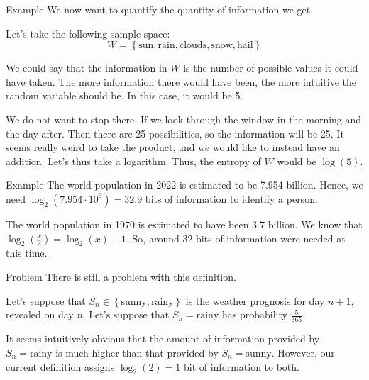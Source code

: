 \documentclass[a4paper]{article}
\begin{document}
\begin{parag}{Example}
    We now want to quantify the quantity of information we get.

    Let's take the following sample space: 
    \[W = \left\{\text{sun}, \text{rain}, \text{clouds}, \text{snow}, \text{hail}\right\}\]
    
    We could say that the information in $W$ is the number of possible values it could have taken. The more information there would have been, the more intuitive the random variable should be. In this case, it would be 5.

    We do not want to stop there. If we look through the window in the morning and the day after. Then there are 25 possibilities, so the information will be 25. It seems really weird to take the product, and we would like to instead have an addition. Let's thus take a logarithm. Thus, the entropy of $W$ would be $\log\left(5\right)$.
\end{parag}

\begin{parag}{Example}
    The world population in 2022 is estimated to be 7.954 billion. Hence, we need $\log_2\left(7.954 \cdot 10^{9}\right) = 32.9$ bits of information to identify a person. 

    The world population in 1970 is estimated to have been 3.7 billion. We know that $\log_2\left(\frac{x}{2}\right) = \log_2\left(x\right) - 1$. So, around 32 bits of information were needed at this time.
\end{parag}

\begin{parag}{Problem}
    There is still a problem with this definition. 

    Let's suppose that $S_n \in \left\{\text{sunny}, \text{rainy}\right\}$ is the weather prognosis for day $n+1$, revealed on day $n$. Let's suppose that $S_n = \text{rainy}$ has probability $\frac{5}{365}$.

    It seems intuitively obvious that the amount of information provided by $S_n = \text{rainy}$ is much higher than that provided by $S_n = \text{sunny}$. However, our current definition assigns $\log_2\left(2\right) = 1$ bit of information to both.
\end{parag}
\end{document}
